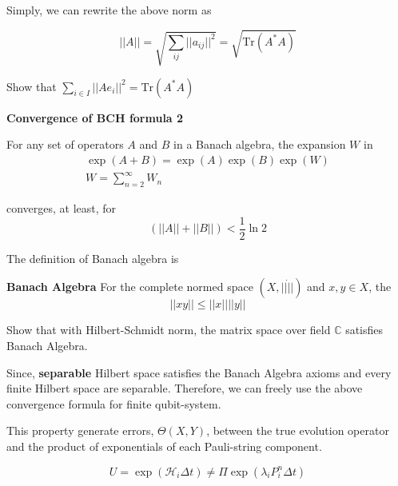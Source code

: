 Simply, we can rewrite the above norm as

\begin{equation}
    ||A|| = \sqrt{\sum_{i j} ||a_{ij}||^2} = \sqrt{\text{Tr} (A^\ast A)}
\end{equation}

\begin{exercise}
    Show that $\sum_{i \in I} ||Ae_i||^2 = \text{Tr} (A^\ast A)$
\end{exercise}

\begin{theorem} \textbf{Convergence of BCH formula 2}
    \label{theorem:converges_BCH_2}
    
    For any set of operators $A$ and $B$ in a Banach algebra, the expansion $W$ in
    \begin{eqnarray}
        \exp(A + B) = \exp(A) \exp(B) \exp(W) \\
        W = \sum_{n=2}^\infty W_n
    \end{eqnarray}

    converges, at least, for
    \begin{equation}
        (||A|| + ||B||) < \frac{1}{2} \ln 2
    \end{equation}
\end{theorem}


\begin{exercise}
    The definition of Banach algebra is 
    \begin{definition}\textbf{Banach Algebra}
        For the complete normed space $(X, ||\dot||)$ and $x, y \in X$, the 
        \begin{equation*}
            ||xy || \leq ||x|| ||y||
        \end{equation*}
    \end{definition}

    Show that with Hilbert-Schmidt norm, the matrix space over field $\mathbb{C}$ 
    satisfies Banach Algebra.
\end{exercise}
Since, \textbf{separable} Hilbert space satisfies the Banach Algebra axioms and every finite Hilbert space are separable.
Therefore, we can freely use the above convergence formula for finite qubit-system.

This property generate errors, $\Theta(X, Y)$, between the true evolution operator 
and the product of exponentials of each Pauli-string component. 

\begin{equation}
    U = \exp(\mathcal{H}_i \Delta t) \neq \Pi \exp(\lambda_i P_i^n \Delta t)
\end{equation}

